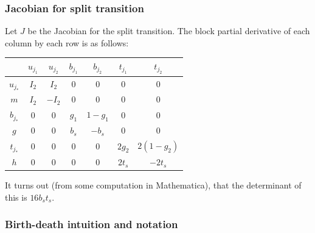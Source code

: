 \documentclass[11pt]{article}
\begin{document}
\subsubsection{Jacobian for split transition}

Let $J$ be the Jacobian for the split transition. The block partial
derivative of each column by each row is as follows:


\begin{center}
\begin{tabular}{|c||c|c|c|c|c|c|}
\cline{2-7} 
\multicolumn{1}{c|}{} & $u_{j_{1}}$ & $u_{j_{2}}$ & $b_{j_{1}}$ & $b_{j_{2}}$ & $t_{j_1}$ & $t_{j_2}$\tabularnewline
\hline 
$u_{j_{*}}$ & $I_2$ & $I_2$ & $0$ & $0$ & 0 & 0\tabularnewline
\hline 
$m$ & $I_2$ & $-I_2$ & $0$ & $0$ & 0 & 0\tabularnewline
\hline 
$b_{j_{*}}$ & $0$ & $0$ & $g_1$ & $1-g_1$ & $0$ & $0$\tabularnewline
\hline 
$g$ & $0$ & $0$ & $b_s$ & $-b_s$ & $0$ & $0$ \tabularnewline
\hline
$t_{j_{*}}$ & $0$ & $0$ & $0$ & $0$ & $2g_2$ & $2 (1-g_2)$\tabularnewline
\hline
$h$ & $0$ & $0$ & $0$ & $0$ &$2t_s$ & $-2t_s$\tabularnewline
\hline
\end{tabular}
\par\end{center}

It turns out (from some computation in Mathematica), that the determinant of this is $16b_s t_s$.

\subsubsection{Birth-death intuition and notation}
\end{document}
